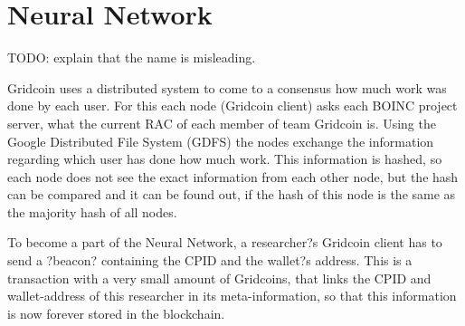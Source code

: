 \section{Neural Network}

TODO: explain that the name is misleading.

Gridcoin uses a distributed system to come to a consensus how much work was done by each user. For this each node (Gridcoin client) asks each BOINC project server, what  the current RAC of each member of team Gridcoin is. Using the Google Distributed File System (GDFS) the nodes exchange the information regarding which user has done how much work. This information is hashed, so each node does not see the exact information from each other node, but the hash can be compared and it can be found out, if the hash of this node is the same as the majority hash of all nodes.

To become a part of the Neural Network, a researcher?s Gridcoin client has to send a ?beacon? containing the CPID and the wallet?s address. This is a transaction with a very small amount of Gridcoins, that links  the CPID  and wallet-address of this researcher in  its meta-information, so that this information is now forever stored in the blockchain.

